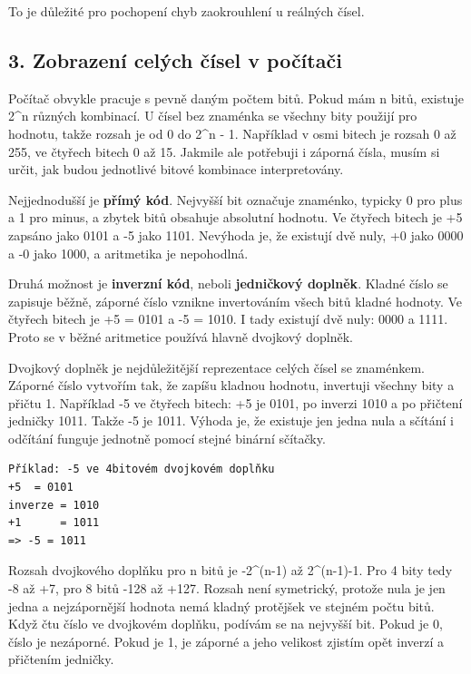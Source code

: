 \documentclass[11pt,a4paper]{article}
\begin{document}
To je důležité pro pochopení chyb zaokrouhlení u reálných čísel.

\subsection*{3. Zobrazení celých čísel v počítači}

Počítač obvykle pracuje s pevně daným počtem bitů. Pokud mám n bitů, existuje 2\textasciicircum{}n různých kombinací. U čísel bez znaménka se všechny bity použijí pro hodnotu, takže rozsah je od 0 do 2\textasciicircum{}n - 1. Například v osmi bitech je rozsah 0 až 255, ve čtyřech bitech 0 až 15. Jakmile ale potřebuji i záporná čísla, musím si určit, jak budou jednotlivé bitové kombinace interpretovány.

Nejjednodušší je \textbf{přímý kód}. Nejvyšší bit označuje znaménko, typicky 0 pro plus a 1 pro minus, a zbytek bitů obsahuje absolutní hodnotu. Ve čtyřech bitech je +5 zapsáno jako 0101 a -5 jako 1101. Nevýhoda je, že existují dvě nuly, +0 jako 0000 a -0 jako 1000, a aritmetika je nepohodlná.

Druhá možnost je \textbf{inverzní kód}, neboli \textbf{jedničkový doplněk}. Kladné číslo se zapisuje běžně, záporné číslo vznikne invertováním všech bitů kladné hodnoty. Ve čtyřech bitech je +5 = 0101 a -5 = 1010. I tady existují dvě nuly: 0000 a 1111. Proto se v běžné aritmetice používá hlavně dvojkový doplněk.

Dvojkový doplněk je nejdůležitější reprezentace celých čísel se znaménkem. Záporné číslo vytvořím tak, že zapíšu kladnou hodnotu, invertuji všechny bity a přičtu 1. Například -5 ve čtyřech bitech: +5 je 0101, po inverzi 1010 a po přičtení jedničky 1011. Takže -5 je 1011. Výhoda je, že existuje jen jedna nula a sčítání i odčítání funguje jednotně pomocí stejné binární sčítačky.

\begin{codebox}
\small
\begin{verbatim}
Příklad: -5 ve 4bitovém dvojkovém doplňku
+5  = 0101
inverze = 1010
+1      = 1011
=> -5 = 1011
\end{verbatim}
\end{codebox}

Rozsah dvojkového doplňku pro n bitů je -2\textasciicircum{}(n-1) až 2\textasciicircum{}(n-1)-1. Pro 4 bity tedy -8 až +7, pro 8 bitů -128 až +127. Rozsah není symetrický, protože nula je jen jedna a nejzápornější hodnota nemá kladný protějšek ve stejném počtu bitů. Když čtu číslo ve dvojkovém doplňku, podívám se na nejvyšší bit. Pokud je 0, číslo je nezáporné. Pokud je 1, je záporné a jeho velikost zjistím opět inverzí a přičtením jedničky.
\end{document}
